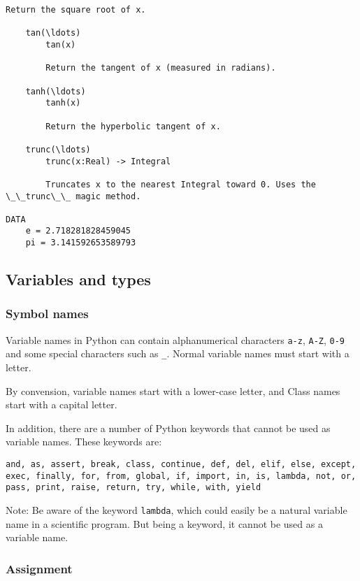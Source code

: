 \documentclass{article}
\begin{document}
\begin{Verbatim}[commandchars=\\\{\}]
        Return the square root of x.
    
    tan(\ldots)
        tan(x)
        
        Return the tangent of x (measured in radians).
    
    tanh(\ldots)
        tanh(x)
        
        Return the hyperbolic tangent of x.
    
    trunc(\ldots)
        trunc(x:Real) -> Integral
        
        Truncates x to the nearest Integral toward 0. Uses the \_\_trunc\_\_ magic method.

DATA
    e = 2.718281828459045
    pi = 3.141592653589793
    \end{Verbatim}

    

    \subsection{Variables and types}\label{variables-and-types}

\subsubsection{Symbol names}\label{symbol-names}

Variable names in Python can contain alphanumerical characters
\texttt{a-z}, \texttt{A-Z}, \texttt{0-9} and some special characters
such as \texttt{\_}. Normal variable names must start with a letter.

By convension, variable names start with a lower-case letter, and Class
names start with a capital letter.

In addition, there are a number of Python keywords that cannot be used
as variable names. These keywords are:

\begin{verbatim}
and, as, assert, break, class, continue, def, del, elif, else, except, 
exec, finally, for, from, global, if, import, in, is, lambda, not, or,
pass, print, raise, return, try, while, with, yield
\end{verbatim}

Note: Be aware of the keyword \texttt{lambda}, which could easily be a
natural variable name in a scientific program. But being a keyword, it
cannot be used as a variable name.

\subsubsection{Assignment}\label{assignment}
\end{document}
